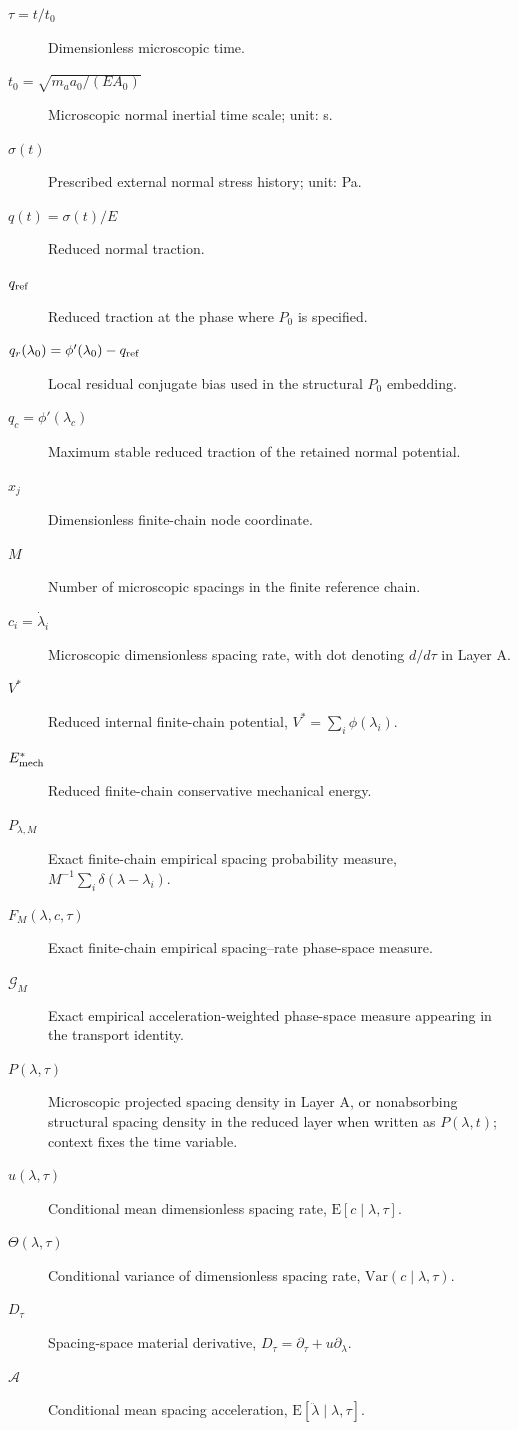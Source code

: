 \begin{description}
\item[$\tau=t/t_0$] Dimensionless microscopic time.
\item[$t_0=\sqrt{m_a a_0/(EA_0)}$] Microscopic normal inertial time scale; unit: s.
\item[$\sigma(t)$] Prescribed external normal stress history; unit: Pa.
\item[$q(t)=\sigma(t)/E$] Reduced normal traction.
\item[$q_{\rm ref}$] Reduced traction at the phase where $P_0$ is specified.
\item[$q_r(\lambda_0)=\phi'(\lambda_0)-q_{\rm ref}$] Local residual conjugate bias used in the structural $P_0$ embedding.
\item[$q_c=\phi'(\lambda_c)$] Maximum stable reduced traction of the retained normal potential.
\item[$x_j$] Dimensionless finite-chain node coordinate.
\item[$M$] Number of microscopic spacings in the finite reference chain.
\item[$c_i=\dot\lambda_i$] Microscopic dimensionless spacing rate, with dot denoting $d/d\tau$ in Layer A.
\item[$V^*$] Reduced internal finite-chain potential, $V^*=\sum_i\phi(\lambda_i)$.
\item[$E_{\rm mech}^*$] Reduced finite-chain conservative mechanical energy.
\item[$P_{\lambda,M}$] Exact finite-chain empirical spacing probability measure, $M^{-1}\sum_i\delta(\lambda-\lambda_i)$.
\item[$F_M(\lambda,c,\tau)$] Exact finite-chain empirical spacing--rate phase-space measure.
\item[$\mathcal G_M$] Exact empirical acceleration-weighted phase-space measure appearing in the transport identity.
\item[$P(\lambda,\tau)$] Microscopic projected spacing density in Layer A, or nonabsorbing structural spacing density in the reduced layer when written as $P(\lambda,t)$; context fixes the time variable.
\item[$u(\lambda,\tau)$] Conditional mean dimensionless spacing rate, $\mathrm E[c\mid\lambda,\tau]$.
\item[$\Theta(\lambda,\tau)$] Conditional variance of dimensionless spacing rate, $\mathrm{Var}(c\mid\lambda,\tau)$.
\item[$D_\tau$] Spacing-space material derivative, $D_\tau=\partial_\tau+u\partial_\lambda$.
\item[$\mathcal A$] Conditional mean spacing acceleration, $\mathrm E[\ddot\lambda\mid\lambda,\tau]$.

\end{description}
